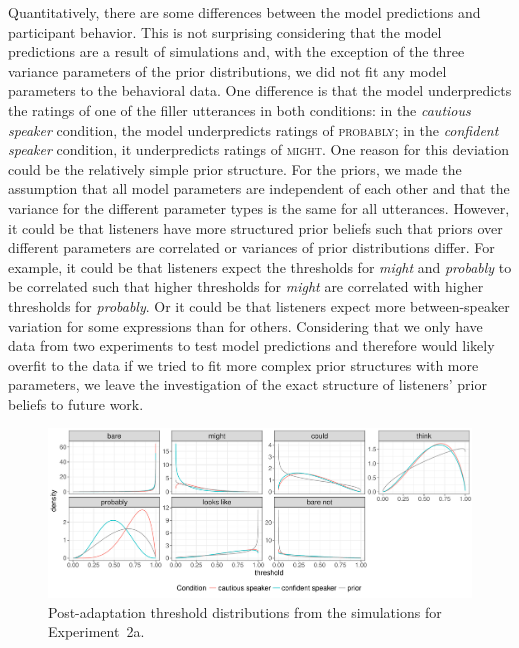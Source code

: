 \documentclass[man, floatsintext]{apa6}
\begin{document}
Quantitatively, there are some differences between the model predictions and participant behavior. This is not surprising considering that the model predictions are a result of simulations
and, with the exception of the three variance parameters of the prior distributions, we did not fit any model parameters to the behavioral data. One difference is that the model underpredicts 
the ratings of one of the filler utterances in both conditions: in the \textit{cautious speaker} condition, the model underpredicts ratings of \textsc{probably}; in the \textit{confident speaker} condition, it underpredicts
ratings of \textsc{might}. One reason for this deviation could be the relatively simple prior structure. For the priors, we made the assumption that all model parameters are independent of each other and 
that the variance for the different parameter types is the same for all utterances. However, it could be that listeners have more structured prior beliefs such that priors over different parameters are correlated or
variances of prior distributions differ. For example, it could be that listeners expect the thresholds for \textit{might} and \textit{probably} to be correlated such that higher thresholds for \textit{might} are correlated 
with higher thresholds for \textit{probably}. Or it could be that listeners expect more between-speaker variation for some expressions than for others. Considering that we only have data from two experiments to test
model predictions and therefore would likely overfit to the data if we tried to fit more complex prior structures with more parameters, we leave  the investigation of the exact structure of listeners' prior beliefs to future work.

\begin{figure}
  \includegraphics[width=\textwidth]{plots/adaptation-posterior-thresholds.pdf}
  \caption{Post-adaptation threshold distributions from the simulations for Experiment~2a. \label{fig:post-exposure-thresholds}}
\end{figure}
\end{document}
